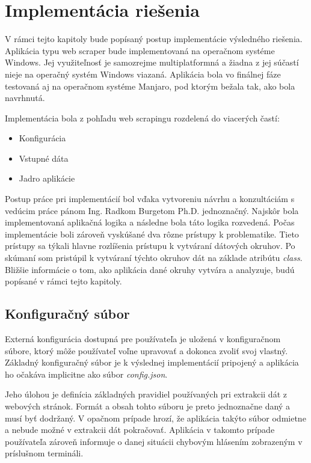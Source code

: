 \chapter{Implementácia riešenia}
\label{implementacia}

V rámci tejto kapitoly bude popísaný postup implementácie výsledného riešenia. Aplikácia typu web scraper bude implementovaná na operačnom systéme Windows. Jej využiteľnosť je samozrejme multiplatformná a žiadna z jej súčastí nieje na operačný systém Windows viazaná. Aplikácia bola vo finálnej fáze testovaná aj na operačnom systéme Manjaro, pod ktorým bežala tak, ako bola navrhnutá.

Implementácia bola z pohľadu web scrapingu rozdelená do viacerých častí:

\begin{itemize}
    \item {Konfigurácia}
    \item {Vstupné dáta}
    \item {Jadro aplikácie}
\end{itemize}

\bigskip

Postup práce pri implementácií bol vďaka vytvoreniu návrhu a konzultáciám s vedúcim práce pánom Ing. Radkom Burgetom Ph.D. jednoznačný. Najskôr bola implementovaná aplikačná logika a následne bola táto logika rozvedená. Počas implementácie boli zároveň vyskúšané dva rôzne prístupy k problematike. Tieto prístupy sa týkali hlavne rozlíšenia prístupu k vytváraní dátových okruhov. Po skúmaní som pristúpil k vytváraní týchto okruhov dát na základe atribútu \textit{class}. Bližšie informácie o tom, ako aplikácia dané okruhy vytvára a analyzuje, budú popísané v rámci tejto kapitoly.

\section{Konfiguračný súbor}

Externá konfigurácia dostupná pre používateľa je uložená v konfiguračnom súbore, ktorý môže používateľ voľne upravovať a dokonca zvoliť svoj vlastný. Základný konfiguračný súbor je k výslednej implementácií pripojený a aplikácia ho očakáva implicitne ako súbor \textit{config.json}.

Jeho úlohou je definícia základných pravidiel používaných pri extrakcii dát z webových stránok. Formát a obsah tohto súboru je preto jednoznačne daný a musí byť dodržaný. V opačnom prípade hrozí, že aplikácia takýto súbor odmietne a nebude možné v extrakcii dát pokračovať. Aplikácia v takomto prípade používateľa zároveň informuje o danej situácii chybovým hlásením zobrazeným v príslušnom termináli. 
\newpage

